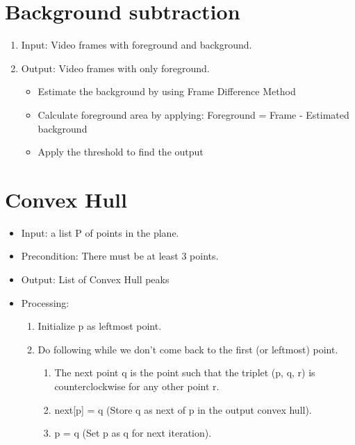 \documentclass{scrreprt}
\begin{document}
\section{Background subtraction}
\begin{enumerate}
    \item Input: Video frames with foreground and background.
    \item Output: Video frames with only foreground. 
    \begin{itemize}
        \item Estimate the background by using Frame Difference Method
        \item Calculate foreground area by applying: Foreground = Frame - Estimated background
        \item Apply the threshold to find the output
    \end{itemize}
\end{enumerate}
\section{Convex Hull}
\begin{itemize}
    \item Input: a list P of points in the plane.
    \item Precondition: There must be at least 3 points.
    \item Output: List of Convex Hull peaks
    \item Processing:
    \begin{enumerate}
        \item Initialize p as leftmost point.
        \item Do following while we don’t come back to the first (or leftmost) point.
        \begin{enumerate}
            \item The next point q is the point such that the triplet (p, q, r) is counterclockwise for any other point r.
            \item next[p] = q (Store q as next of p in the output convex hull).
            \item p = q (Set p as q for next iteration).
        \end{enumerate}
    \end{enumerate}
\end{itemize}
\end{document}
